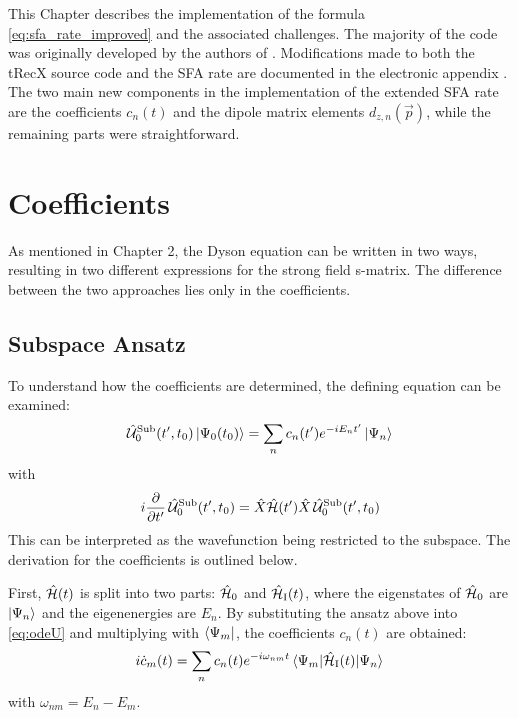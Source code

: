This Chapter describes the implementation of the formula \eqref{eq:sfa_rate_improved} and the associated challenges.
The majority of the code was originally developed by the authors of \cite{Theory_NPS}.
Modifications made to both the tRecX source code and the SFA rate are documented in the electronic appendix \cite{johannes_porsch_2025_16223179}.
The two main new components in the implementation of the extended SFA rate are the coefficients $c_n(t)$ and the dipole matrix elements $d_{z,n}(\vec{p})$, while the remaining parts were straightforward.

\section{Coefficients}
As mentioned in Chapter 2, the Dyson equation can be written in two ways, resulting in two different expressions for the strong field s-matrix.
The difference between the two approaches lies only in the coefficients.



\subsection{Subspace Ansatz}
To understand how the coefficients are determined, the defining equation can be examined:
\begin{equation*}
    \hat{\mathcal{U}}^{\mathrm{Sub}}_0(t',t_0)\ket{\Psi_0(t_0)} = \sum_{n}c_n(t')e^{-iE_nt'}\ket{\Psi_n}
\end{equation*}
with
\begin{equation}
    i\frac{\partial}{\partial t'} \, \hat{\mathcal{U}}^{\mathrm{Sub}}_0(t',t_0) = \hat{X}\hat{\mathcal{H}}(t')\hat{X}\,\hat{\mathcal{U}}^{\mathrm{Sub}}_0(t',t_0)    \label{eq:odeU}
\end{equation}
This can be interpreted as the wavefunction being restricted to the subspace.
The derivation for the coefficients is outlined below.

First, $\hat{\mathcal{H}}(t)$ is split into two parts: $\hat{\mathcal{H}}_0$ and $\hat{\mathcal{H}}_{\mathrm{I}}(t)$, where the eigenstates of $\hat{\mathcal{H}}_0$ are ${\ket{\Psi_n}}$ and the eigenenergies are ${E_n}$. 
By substituting the ansatz above into \eqref{eq:odeU} and multiplying with $\bra{\Psi_m}$, the coefficients $c_n(t)$ are obtained:
\begin{equation*}
    i  \dot{c}_m(t) = \sum_n c_n(t) e^{-i \omega_{nm} t} \braket{\Psi_m|\hat{\mathcal{H}}_{\mathrm{I}}(t)|\Psi_n}  \label{eq:ode}
\end{equation*}
with $\omega_{nm} = E_n - E_m$.

